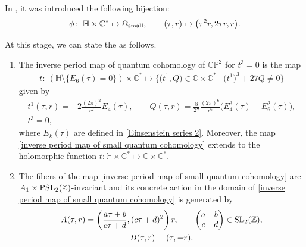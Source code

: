 In \cite[Section 2.3]{Milanov}, it was introduced the following bijection:
\[%
\phi\colon\ \mathbb{H}\times \mathbb{C}^{*} \mapsto \Omega_{\rm small},\qquad
(\tau,r) \mapsto \bigl(\tau^2r,2\tau r, r\bigr).
\]

At this stage, we can state the \cite[Theorem 2.3]{Milanov} as follows.

\begin{Lemma}\label{Lemma Milanov affine small quantum cohomology}\quad
\begin{enumerate}\itemsep=0pt
\item[$(1)$]
The inverse period map of quantum cohomology of $\mathbb{CP}^2$ for $t^3=0$ is the map
\begin{gather*}
t\colon\ (\mathbb{H}\setminus\{E_6(\tau)=0 \})\times \mathbb{C}^{*} \mapsto \bigl\{ \bigl(t^1,Q\bigr) \in \mathbb{C}\times \mathbb{C}^{*} \mid \bigl(t^1\bigr)^3+27Q\neq 0\bigr\}
\end{gather*}
given by
\begin{gather}
t^1(\tau,r)=-2\frac{ (2\pi )^2}{r^2} E_4(\tau) ,\qquad
Q(\tau,r)=\frac{8}{27}\frac{(2\pi)^6 }{r^6} \bigl(E_4^3(\tau)-E_6^2(\tau) \bigr) ,\nonumber\\
t^3=0,\label{inverse period map of small quantum cohomology}
\end{gather}
where $E_k(\tau)$ are defined in \eqref{Einsenstein series 2}. Moreover, the map \eqref{inverse period map of small quantum cohomology} extends to the holomorphic function
$
t\colon \mathbb{H}\times \mathbb{C}^{*} \mapsto \mathbb{C}\times \mathbb{C}^{*}$.
\item[$(2)$]
The fibers of the map \eqref{inverse period map of small quantum cohomology} are $A_1\times {\rm PSL}_2(\mathbb{Z})$-invariant and its concrete action in the domain of \eqref{inverse period map of small quantum cohomology} is generated by
\begin{gather}
A(\tau,r)=\left( \frac{a\tau+b}{c\tau+d} , (c\tau+d)^2\right)r,\qquad {\begin{pmatrix}
a& b \\
c& d \\
\end{pmatrix}} \in {\rm SL}_2(\mathbb{Z}),\nonumber\\
B(\tau,r)=( \tau , -r).\label{Monodromy action affine small quantum cohomology}
\end{gather}
\end{enumerate}
\end{Lemma}

